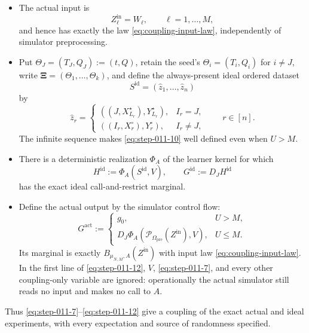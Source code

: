 \begin{lemma}
\begin{itemize}
\item The actual input is
  \[
    Z^{\mathrm{in}}_\ell=W_\ell,\qquad \ell=1,\ldots,M,
  \tag{S11.8}\label{eq:step-011-8}
  \]
  and hence has exactly the law \eqref{eq:coupling-input-law}, independently of simulator
  preprocessing.
\item Put \(\Theta_J=(T_J,Q_J):=(t,Q)\), retain the seed's
  \(\Theta_i=(T_i,Q_i)\) for \(i\ne J\), write
  \(\boldsymbol\Xi=(\Theta_1,\ldots,\Theta_k)\), and define the always-present
  ideal ordered dataset
  \[
    S^{\mathrm{id}}=(\widehat z_1,\ldots,\widehat z_n)
  \tag{S11.9}\label{eq:step-011-9}
  \]
  by
  \[
    \widehat z_r=
    \begin{cases}
      ((J,X_{L_r}^\star),Y_{L_r}^\star),&I_r=J,\\[1mm]
      ((I_r,X_r^\circ),Y_r^\circ),&I_r\ne J,
    \end{cases}
    \qquad r\in[n].
  \tag{S11.10}\label{eq:step-011-10}
  \]
  The infinite sequence makes \eqref{eq:step-011-10} well defined even when \(U>M\).
\item There is a deterministic realization \(\Phi_A\) of the learner kernel
  for which
  \[
    H^{\mathrm{id}}:=\Phi_A(S^{\mathrm{id}},V),
    \qquad
    G^{\mathrm{id}}:=D_JH^{\mathrm{id}}
  \tag{S11.11}\label{eq:step-011-11}
  \]
  has the exact ideal call-and-restrict marginal.
\item Define the actual output by the simulator control flow:
  \[
    G^{\mathrm{act}}:=
    \begin{cases}
      g_0,&U>M,\\
      D_J\Phi_A(\mathcal P_{\Omega_{\mathrm{pre}}}
                    (Z^{\mathrm{in}}),V),&U\le M.
    \end{cases}
  \tag{S11.12}\label{eq:step-011-12}
  \]
  Its marginal is exactly
  \(B_{\mu_{N,M},A}(Z^{\mathrm{in}})\) with input law \eqref{eq:coupling-input-law}.
  In the first line of \eqref{eq:step-011-12}, \(V\), \eqref{eq:step-011-7}, and every other coupling-only
  variable are ignored: operationally the actual simulator still reads no
  input and makes no call to \(A\).
\end{itemize}

Thus \eqref{eq:step-011-7}--\eqref{eq:step-011-12} give a coupling of the exact actual and ideal experiments,
with every expectation and source of randomness specified.
\end{lemma}

